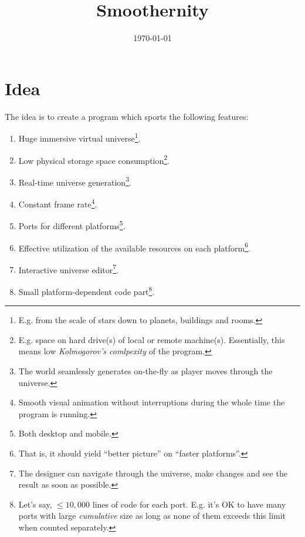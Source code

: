 \documentclass[12pt]{article}
\title{Smoothernity}
\date{\today}
\begin{document}
\maketitle

\tableofcontents

\pagebreak

\section{Idea}

The idea is to create a program which sports the following features:

\begin{enumerate}
    \item
        Huge immersive virtual universe\footnote{
            E.g. from the scale of stars down to planets, buildings and rooms.}.
    \item
        Low physical storage space consumption\footnote{
            E.g. space on hard drive(s) of local or remote machine(s).
            Essentially, this means low \emph{Kolmogorov's comlpexity}
            of the program.}.
    \item
        Real-time universe generation\footnote{
            The world seamlessly generates on-the-fly as player moves through
            the universe.
        }.
    \item
        Constant frame rate\footnote{
            Smooth visual animation without interruptions during the whole
            time the program is running.
        }.
    \item
        Ports for different platforms\footnote{
            Both desktop and mobile.}.
    \item
        Effective utilization of the available resources on each
        platform\footnote{
            That is, it should yield ``better picture'' on
            ``faster platforms''.}.
    \item
        Interactive universe editor\footnote{
            The designer can navigate through the universe, make changes
            and see the result as soon as possible.}.
    \item
        Small platform-dependent code part\footnote{
            Let's say, \(\le 10,000\) lines of code for each port.
            E.g. it's OK to have many ports with large \emph{cumulative}
            size as long as none of them exceeds this limit when counted
            separately.}.
\end{enumerate}
\end{document}
